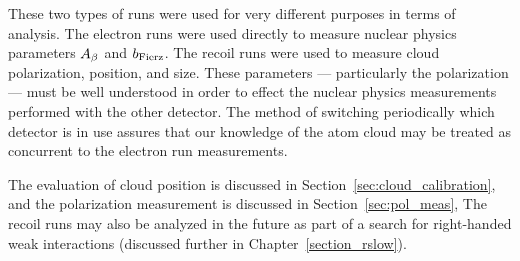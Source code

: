
These two types of runs were used for very different purposes in terms of analysis.  The electron runs were used directly to measure nuclear physics parameters $A_{\beta}$ and $b_{\mathrm{Fierz}}$.  The recoil runs were used to measure cloud polarization, position, and size.  These parameters --- particularly the polarization --- must be well understood in order to effect the nuclear physics measurements performed with the other detector.  The method of switching periodically which detector is in use assures that our knowledge of the atom cloud may be treated as concurrent to the electron run measurements.

The evaluation of cloud position is discussed in Section~\ref{sec:cloud_calibration}, 
and the polarization measurement is discussed in Section~\ref{sec:pol_meas},
The recoil runs may also be analyzed in the future as part of a search for right-handed weak interactions (discussed further in Chapter~\ref{section_rslow}).



